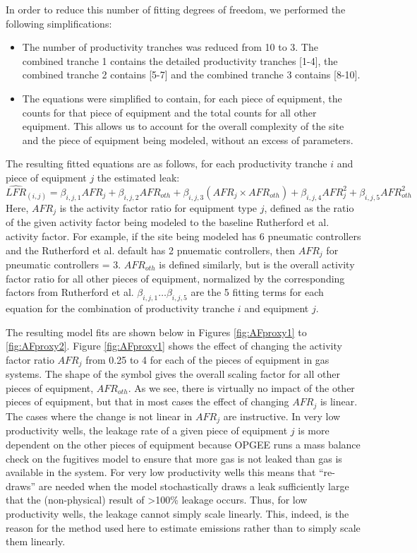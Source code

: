 \documentclass[11pt]{report}
\begin{document}
In order to reduce this number of fitting degrees of freedom, we performed the following simplifications:
\begin{itemize}
\item The number of productivity tranches was reduced from 10 to 3. The combined tranche 1 contains the detailed productivity tranches [1-4], the combined tranche 2 contains [5-7] and the combined tranche 3 contains [8-10].
\item The equations were simplified to contain, for each piece of equipment, the counts for that piece of equipment and the total counts for all other equipment. This allows us to account for the overall complexity of the site and the piece of equipment being modeled, without an excess of parameters.
\end{itemize}

The resulting fitted equations are as follows, for each productivity tranche $i$ and piece of equipment $j$ the estimated leak:
\begin{equation} 
\widehat{LFR}_{(i,j)} = \beta_{i,j,1}AFR_j  + \beta_{i,j,2} AFR_{oth} + \beta_{i,j,3}\left( AFR_j \times AFR_{oth} \right) +  \beta_{i,j,4} AFR_j^2 +  \beta_{i,j,5} AFR_{oth}^2
\end{equation}
Here, $AFR_j$ is the activity factor ratio for equipment type $j$, defined as the ratio of the given activity factor being modeled to the baseline Rutherford et al. activity factor. For example, if the site being modeled has 6 pneumatic controllers and the Rutherford et al. default has 2 pnuematic controllers, then $AFR_j$ for pneumatic controllers = 3. $AFR_{oth}$ is defined similarly, but is the overall activity factor ratio for all other pieces of equipment, normalized by the corresponding factors from Rutherford et al. $\beta_{i,j,1} \ldots \beta_{i,j,5}$ are the 5 fitting terms for each equation for the combination of productivity tranche $i$ and equipment $j$.

The resulting model fits are shown below in Figures \ref{fig:AFproxy1} to \ref{fig:AFproxy2}. Figure \ref{fig:AFproxy1} shows the effect of changing the activity factor ratio $AFR_j$ from 0.25 to 4 for each of the pieces of equipment in gas systems. The shape of the symbol gives the overall scaling factor for all other pieces of equipment, $AFR_{oth}$. As we see, there is virtually no impact of the other pieces of equipment, but that in most cases the effect of changing $AFR_j$ is linear. The cases where the change is not linear in $AFR_j$ are instructive. In very low productivity wells, the leakage rate of a given piece of equipment $j$ is more dependent on the other pieces of equipment because OPGEE runs a mass balance check on the fugitives model to ensure that more gas is not leaked than gas is available in the system. For very low productivity wells this means that ``re-draws'' are needed when the model stochastically draws a leak sufficiently large that the (non-physical) result of >100\% leakage occurs. Thus, for low productivity wells, the leakage cannot simply scale linearly. This, indeed, is the reason for the method used here to estimate emissions rather than to simply scale them linearly.
\end{document}
